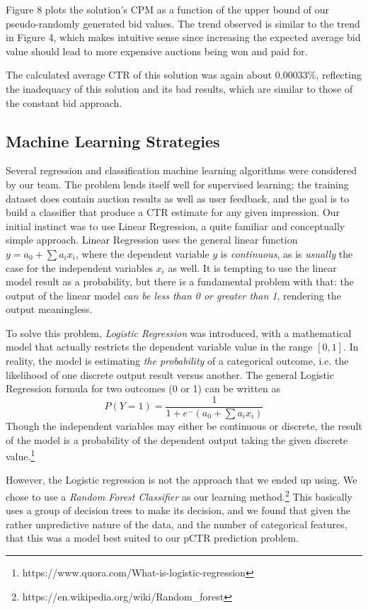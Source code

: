 \documentclass{sig-alternate-05-2015}
\begin{document}
Figure 8 plots the solution's CPM as a function of the upper bound of our pseudo-randomly generated bid values. The trend observed is similar to the trend in Figure 4, which makes intuitive sense since increasing the expected average bid value should lead to more expensive auctions being won and paid for.

The calculated average CTR of this solution was again about $0.00033\%$, reflecting the inadequacy of this solution and its bad results, which are similar to those of the constant bid approach.

\subsection{Machine Learning Strategies} \label{ml}
Several regression and classification machine learning algorithms were considered by our team. The problem lends itself well for supervised learning; the training dataset does contain auction results as well as user feedback, and the goal is to build a classifier that produce a CTR estimate for any given impression. Our initial instinct was to use Linear Regression, a quite familiar and conceptually simple approach. Linear Regression uses the general linear function $y = a_0 +  \sum a_i x_i$, where the dependent variable $y$ is \textit{continuous}, as is \textit{usually} the case for the independent variables $x_i$ as well. It is tempting to use the linear model result as a probability, but there is a fundamental problem with that: the output of the linear model \textit{can be less than 0 or greater than 1}, rendering the output meaningless.

To solve this problem, \textit{Logistic Regression} was introduced, with a mathematical model that actually restricts the dependent variable value in the range $[0,1]$. In reality, the model is estimating \textit{the probability} of a categorical outcome, i.e. the likelihood of one discrete output result versus another. The general Logistic Regression formula for two outcomes (0 or 1) can be written as \[P(Y=1) = \frac{1}{1+e^-(a_0+\sum a_i x_i)}\]
Though the independent variables may either be continuous or discrete, the result of the model is a probability of the dependent output taking the given discrete value.\footnote{https://www.quora.com/What-is-logistic-regression}

However, the Logistic regression is not the approach that we ended up using. We chose to use a \textit{Random Forest Classifier} as our learning method.\footnote{https://en.wikipedia.org/wiki/Random\_forest} This basically uses a group of decision trees to make its decision, and we found that given the rather unpredictive nature of the data, and the number of categorical features, that this was a model best suited to our pCTR prediction problem.
\end{document}
